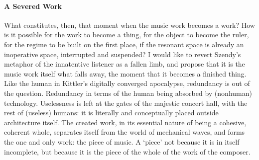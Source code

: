 





\paragraph{A Severed Work}
What constitutes, then, that moment when the music work becomes a work? How is it possible for the work to become a thing, for the object to become the ruler, for the regime to be built on the first place, if the resonant space is already an inoperative space, interrupted and suspended? I would like to revert Szendy's metaphor of the innatentive listener as a fallen limb, and propose that it is the music work itself what falls away, the moment that it becomes a finished thing. Like the human in Kittler's digitally converged apocalypse, redundancy is out of the question. Redundancy in terms of the human being absorbed by (nonhuman) technology. Uselessness is left at the gates of the majestic concert hall, with the rest of (useless) humans: it is literally and conceptually placed outside architecture itself. The created work, in its essential nature of being a cohesive, coherent whole, separates itself from the world of mechanical waves, and forms the one and only work: the piece of music. A `piece' not because it is in itself incomplete, but because it is the piece of the whole of the work of the composer.



